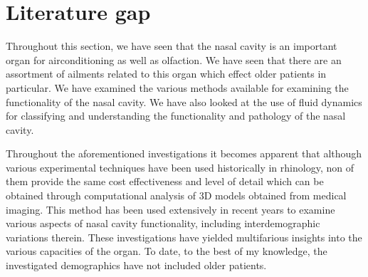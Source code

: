 \section{Literature gap}

Throughout this section, we have seen that the nasal cavity is an important organ for airconditioning as well as olfaction. We have seen that there are an assortment of ailments related to this organ which effect older patients in particular. We have examined the various methods available for examining the functionality of the nasal cavity. We have also looked at the use of fluid dynamics for classifying and understanding the functionality and pathology of the nasal cavity.

Throughout the aforementioned investigations it becomes apparent that although various experimental techniques have been used historically in rhinology, non of them provide the same cost effectiveness and level of detail which can be obtained through computational analysis of 3D models obtained from medical imaging. This method has been used extensively in recent years to examine various aspects of nasal cavity functionality, including interdemographic variations therein. These investigations have yielded multifarious insights into the various capacities of the organ. To date, to the best of my knowledge, the investigated demographics have not included older patients.
